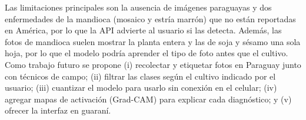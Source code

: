 \documentclass[conference]{IEEEtran}
\begin{document}
Las limitaciones principales son la ausencia de im\'agenes paraguayas y dos enfermedades de la mandioca (mosaico y estr\'ia marr\'on) que no est\'an reportadas en Am\'erica, por lo que la API advierte al usuario si las detecta. Adem\'as, las fotos de mandioca suelen mostrar la planta entera y las de soja y s\'esamo una sola hoja, por lo que el modelo podr\'ia aprender el tipo de foto antes que el cultivo. Como trabajo futuro se propone (i) recolectar y etiquetar fotos en Paraguay junto con t\'ecnicos de campo; (ii) filtrar las clases seg\'un el cultivo indicado por el usuario; (iii) cuantizar el modelo para usarlo sin conexi\'on en el celular; (iv) agregar mapas de activaci\'on (Grad-CAM) para explicar cada diagn\'ostico; y (v) ofrecer la interfaz en guaran\'i.



\end{document}

